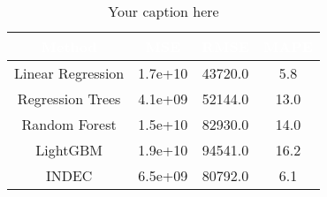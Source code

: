 \begin{table}[htb]
\centering
\begin{tabular}{|c|c|c|c|}
\hline
\textbf{\cellcolor[rgb]{0,0.231,0.427}\textcolor{white}{Method}} & \textbf{\cellcolor[rgb]{0,0.231,0.427}\textcolor{white}{MSE}} & \textbf{\cellcolor[rgb]{0,0.231,0.427}\textcolor{white}{RMSE}} & \textbf{\cellcolor[rgb]{0,0.231,0.427}\textcolor{white}{MAPE}} \\ \hline
Linear Regression & 1.7e+10 & 43720.0 & 5.8 \\
Regression Trees & 4.1e+09 & 52144.0 & 13.0 \\
Random Forest & 1.5e+10 & 82930.0 & 14.0 \\
LightGBM & 1.9e+10 & 94541.0 & 16.2 \\
INDEC & 6.5e+09 & 80792.0 & 6.1 \\
\hline
\end{tabular}
\caption{Your caption here}
\label{tab:my_table}
\end{table}
